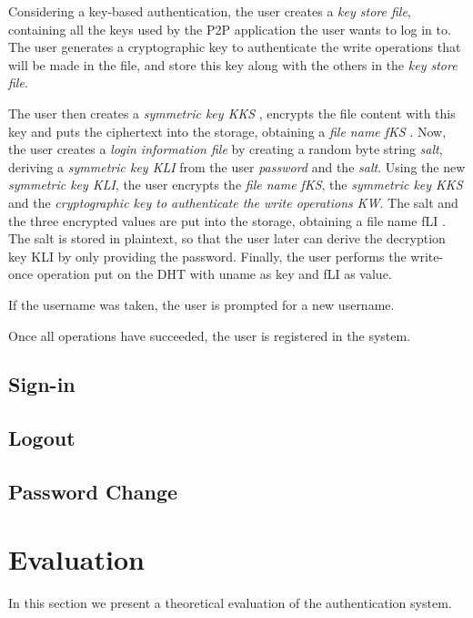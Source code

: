 Considering a key-based authentication, the user creates a \textit{key store file}, containing all the
keys used by the P2P application the user wants to log in to.
The user generates a cryptographic key to authenticate the write operations
that will be made in the file, and store this key along with the others in the
\textit{key store file}.


The user then creates a \textit{symmetric key KKS} ,
encrypts the file content with this key and puts the ciphertext
into the storage, obtaining a \textit{file name fKS} . Now, the user
creates a \textit{login information file} by creating a random
byte string \textit{salt}, deriving a \textit{symmetric key KLI} from the user
\textit{password} and the \textit{salt}.
Using the new \textit{ symmetric key KLI}, the user encrypts the \textit{file name fKS},
the \textit{symmetric key KKS} and the \textit{cryptographic key to
authenticate the write operations KW}.
 The salt and the three encrypted values are put
into the storage, obtaining a file name fLI . The salt is stored
in plaintext, so that the user later can derive the decryption
key KLI by only providing the password. Finally, the user
performs the write-once operation put on the DHT with
uname as key and fLI as value.

If the username was taken,
the user is prompted for a new username.

Once all operations
have succeeded, the user is registered in the system.


\section{Sign-in}
\section{Logout}
\section{Password Change}

\chapter{Evaluation}

In this section we present a theoretical evaluation of
the authentication system.

